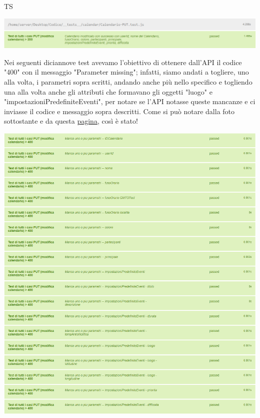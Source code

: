 \begin{listaPersonale}{TS}
                \begin{center}
                        \includegraphics[width=1\textwidth, height=0.08\textheight]{img/png/tests/CalendarioPut/200_putCalendario.png}
                \end{center}
                Nei seguenti diciannove test avevamo l'obiettivo di ottenere dall'API il codice "400" con il messaggio "Parameter missing"; infatti, siamo andati a togliere, uno alla volta, i parametri sopra scritti, andando anche più nello specifico e togliendo una alla volta anche gli attributi che formavano gli oggetti "luogo" e "impostazioniPredefiniteEventi", per notare se l'API notasse queste mancanze e ci inviasse il codice e messaggio sopra descritti. Come si può notare dalla foto sottostante e da questa \href{https://plan-it.it/test-report.html} {pagina}, così è stato!
                \begin{center}
                        \includegraphics[width=1\textwidth, height=0.75\textheight]{img/png/tests/CalendarioPut/400_missingParameter_PutCalendario.png}

\end{center}
\end{listaPersonale}
